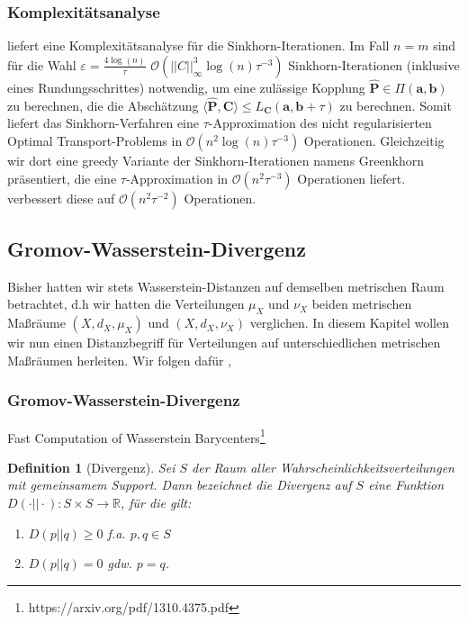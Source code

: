 \documentclass[11pt,a4paper]{article}
\newtheorem{definition}[theorem]{Definition}
\numberwithin{equation}{section}
\begin{document}
	\subsubsection{Komplexitätsanalyse}
	\cite{altschuler2017near} liefert eine Komplexitätsanalyse für die Sinkhorn-Iterationen. Im Fall $n=m$ sind für die Wahl $\varepsilon = \frac{4 \log (n)}{\tau}$ $\mathcal{O}(||C||_\infty^3 \log (n)\tau ^{-3})$ Sinkhorn-Iterationen (inklusive eines Rundungsschrittes) notwendig, um eine zulässige Kopplung $\hat{\boldsymbol{P}} \in \Pi(\boldsymbol{a}, \boldsymbol{b})$ zu berechnen, die die Abschätzung $\langle \hat{\boldsymbol{P}}, \boldsymbol{C} \rangle \leq L_{\boldsymbol{C}}(\boldsymbol{a}, \boldsymbol{b} +  \tau)$ zu berechnen. Somit liefert das Sinkhorn-Verfahren eine $\tau$-Approximation des nicht regularisierten Optimal Transport-Problems in $\mathcal{O}(n^2 \log (n)\tau ^{-3})$ Operationen.
	Gleichzeitig wir dort eine greedy Variante der Sinkhorn-Iterationen namens Greenkhorn präsentiert, die eine $\tau$-Approximation in $\mathcal{O}(n^2\tau^{-3})$ Operationen liefert.
	\cite{dvurechensky2018computational} verbessert diese auf $\mathcal{O}(n^2\tau^{-2})$ Operationen.
	\subsection{Gromov-Wasserstein-Divergenz}
	Bisher hatten wir stets Wasserstein-Distanzen auf demselben metrischen Raum betrachtet, d.h wir hatten die Verteilungen  $\mu_X$ und $\nu_X$  beiden metrischen Maßräume $(X,d_X,\mu_X)$ und $(X,d_X,\nu_X)$ verglichen. In diesem Kapitel wollen wir nun einen Distanzbegriff für Verteilungen auf unterschiedlichen metrischen Maßräumen herleiten. Wir folgen dafür \cite{memoli2011gromov}, \cite{}
	\subsubsection{Gromov-Wasserstein-Divergenz}
	Fast Computation of Wasserstein Barycenters\footnote{https://arxiv.org/pdf/1310.4375.pdf}
	\begin{definition}[Divergenz]
		Sei $S$ der Raum aller Wahrscheinlichkeitsverteilungen mit gemeinsamem Support. Dann bezeichnet die Divergenz auf $S$ eine Funktion $D(\cdot || \cdot):S \times S \to \mathbb{R}$, für die gilt:
		\begin{enumerate}
			\item $D(p || q) \geq 0$ f.a. $p,q \in S$\\
			\item $D(p || q) = 0$ gdw. $p = q$.
		\end{enumerate}
	\end{definition}
	
\end{document}
